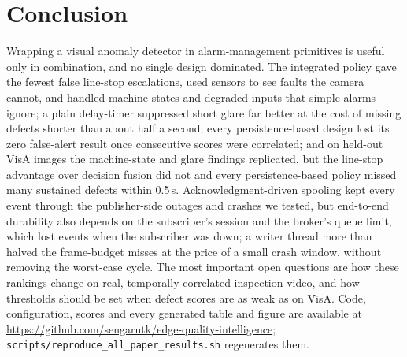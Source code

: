 \documentclass[conference]{IEEEtran}
\begin{document}
\section{Conclusion}
Wrapping a visual anomaly detector in alarm-management primitives is useful only in combination, and no single design dominated. The integrated policy gave the fewest false line-stop escalations, used sensors to see faults the camera cannot, and handled machine states and degraded inputs that simple alarms ignore; a plain delay-timer suppressed short glare far better at the cost of missing defects shorter than about half a second; every persistence-based design lost its zero false-alert result once consecutive scores were correlated; and on held-out VisA images the machine-state and glare findings replicated, but the line-stop advantage over decision fusion did not and every persistence-based policy missed many sustained defects within 0.5\,s. Acknowledgment-driven spooling kept every event through the publisher-side outages and crashes we tested, but end-to-end durability also depends on the subscriber's session and the broker's queue limit, which lost events when the subscriber was down; a writer thread more than halved the frame-budget misses at the price of a small crash window, without removing the worst-case cycle. The most important open questions are how these rankings change on real, temporally correlated inspection video, and how thresholds should be set when defect scores are as weak as on VisA. Code, configuration, scores and every generated table and figure are available at \url{https://github.com/sengarutk/edge-quality-intelligence}; \texttt{scripts/reproduce\_all\_paper\_results.sh} regenerates them.



\end{document}
